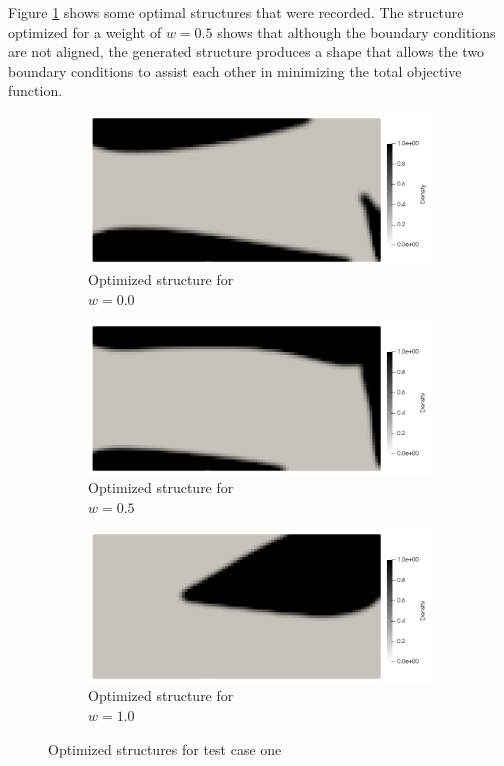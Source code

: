 Figure \ref{fig:test_case_one_structures} shows some optimal structures that were recorded. The structure optimized for a weight of $w=0.5$ shows that although the boundary conditions are not aligned, the generated structure produces a shape that allows the two boundary conditions to assist each other in minimizing the total objective function.
\begin{figure}[ht]
    \begin{subfigure}[b]{0.3\linewidth}
        \includegraphics[width=\linewidth]{figures/chapter_6/Case2_MF_0to1.png}
        \caption{Optimized structure for \\$w=0.0$}
    \end{subfigure}
    \hfill
    \begin{subfigure}[b]{0.3\linewidth}
        \includegraphics[width=\linewidth]{figures/chapter_6/Case2_MF_1to1.png}
        \caption{Optimized structure for \\$w=0.5$}
    \end{subfigure}
    \hfill
    \begin{subfigure}[b]{0.3\linewidth}
        \includegraphics[width=\linewidth]{figures/chapter_6/Case2_MF_1to0.png}
        \caption{Optimized structure for \\$w=1.0$}
    \end{subfigure}
    \caption{Optimized structures for test case one}
    \label{fig:test_case_one_structures}
\end{figure}

